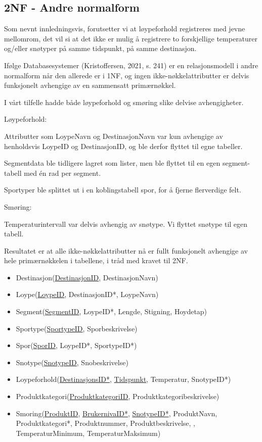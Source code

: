 \documentclass[10pt, a4paper]{article}
\begin{document}
\subsection{2NF - Andre normalform}

Som nevnt innledningsvis, forutsetter vi at løypeforhold registreres med jevne mellomrom, det vil si at det ikke er mulig å registrere to forskjellige temperaturer og/eller snøtyper på samme tidspunkt, på samme destinasjon.

Ifølge Databasesystemer (Kristoffersen, 2021, s. 241) er en relasjonsmodell i andre normalform når den allerede er i 1NF, og ingen ikke-nøkkelattributter er delvis funksjonelt avhengige av en sammensatt primærnøkkel.

I vårt tilfelle hadde både løypeforhold og smøring slike delvise avhengigheter.

Løypeforhold:

Attributter som LoypeNavn og DestinasjonNavn var kun avhengige av henholdsvis LoypeID og DestinasjonID, og ble derfor flyttet til egne tabeller.

Segmentdata ble tidligere lagret som lister, men ble flyttet til en egen segment-tabell med én rad per segment.

Sportyper ble splittet ut i en koblingstabell spor, for å fjerne flerverdige felt.

Smøring:

Temperaturintervall var delvis avhengig av snøtype. Vi flyttet snøtype til egen tabell.

Resultatet er at alle ikke-nøkkelattributter nå er fullt funksjonelt avhengige av hele primærnøkkelen i tabellene, i tråd med kravet til 2NF.

\begin{itemize}
	\item Destinasjon(\underline{DestinasjonID}, DestinasjonNavn)
	\item Loype(\underline{LoypeID}, DestinasjonID*, LoypeNavn) 
	\item Segment(\underline{SegmentID}, LoypeID*, Lengde, Stigning, Hoydetap) 
	\item Sportype(\underline{SportypeID}, Sporbeskrivelse)
	\item Spor(\underline{SporID}, LoypeID*, SportypeID*)
	\item Snotype(\underline{SnotypeID}, Snobeskrivelse) 
	\item Loypeforhold(\underline{DestinasjonsID*}, \underline{Tidspunkt}, Temperatur, SnotypeID*)
	\item Produktkategori(\underline{ProduktkategoriID}, Produktkategoribeskrivelse) 
	\item Smoring(\underline{ProduktID}, \underline{BrukernivaID*}, \underline{SnotypeID*}, ProduktNavn, Produktkategori*, Produktnummer, Produktbeskrivelse, , TemperaturMinimum, TemperaturMaksimum) 
\end{itemize}
\end{document}
